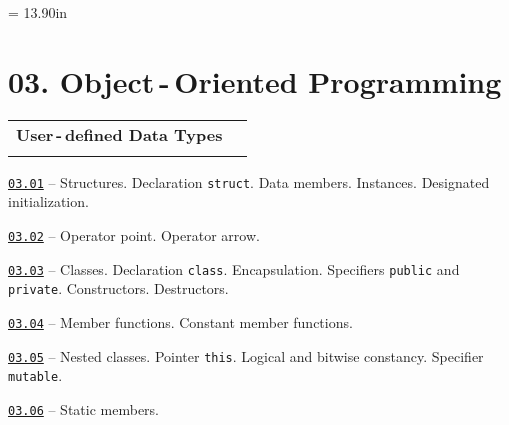 \documentclass[a4paper,12pt]{article}
\renewenvironment{itemize}
{
    \begin{list}{\labelitemi}
    {
      \setlength{\topsep}{0pt}
      \setlength{\partopsep}{0pt}
      \setlength{\parskip}{0pt}
      \setlength{\itemsep}{0pt}
      \setlength{\parsep}{0pt}
      \setlength{\leftmargin}{14.5pt}
    }
}{\end{list}}
\begin{document}
\newpage\thispagestyle{empty}\pdfpageheight = 13.90in\enlargethispage{100in}

\section{03. Object\,-\,Oriented Programming}

\begin{tabular}{!{\vrule width 1pt}L{5.1cm}!{\vrule width 1pt}L{13.9cm}!{\vrule width 0pt}} 


\textbf{User\,-\,defined Data Types} & \\


\end{tabular}

\medskip\smallskip

\begin{itemize}

    \item \href{https://github.com/i-s-m-mipt/Education/blob/master/projects/examples/source/03.01.cpp}{\texttt{03.01}} -- Structures. Declaration \lstinline{struct}. Data members. Instances. Designated initialization.

    \smallskip

    \item \href{https://github.com/i-s-m-mipt/Education/blob/master/projects/examples/source/03.02.cpp}{\texttt{03.02}} -- Operator point. Operator arrow.

    \smallskip

    \item \href{https://github.com/i-s-m-mipt/Education/blob/master/projects/examples/source/03.03.cpp}{\texttt{03.03}} -- Classes. Declaration \lstinline{class}. Encapsulation. Specifiers \lstinline{public} and \lstinline{private}. Constructors. Destructors.

    \smallskip

    \item \href{https://github.com/i-s-m-mipt/Education/blob/master/projects/examples/source/03.04.cpp}{\texttt{03.04}} -- Member functions. Constant member functions.

    \smallskip

    \item \href{https://github.com/i-s-m-mipt/Education/blob/master/projects/examples/source/03.05.cpp}{\texttt{03.05}} -- Nested classes. Pointer \lstinline{this}. Logical and bitwise constancy. Specifier \lstinline{mutable}.

    \smallskip

    \item \href{https://github.com/i-s-m-mipt/Education/blob/master/projects/examples/source/03.06.cpp}{\texttt{03.06}} -- Static members.

\end{itemize}
\end{document}
